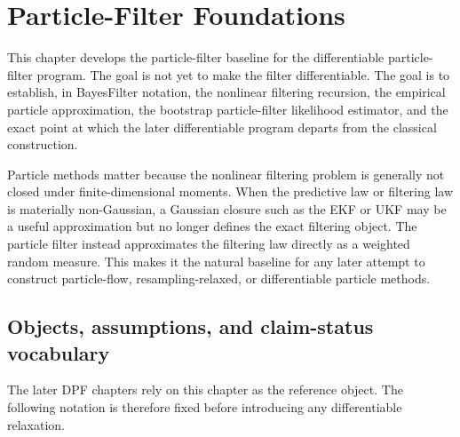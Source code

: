 \chapter{Particle-Filter Foundations}
\label{ch:bf-particle-filters}

This chapter develops the particle-filter baseline for the differentiable
particle-filter program.  The goal is not yet to make the filter
differentiable.  The goal is to establish, in BayesFilter notation, the
nonlinear filtering recursion, the empirical particle approximation, the
bootstrap particle-filter likelihood estimator, and the exact point at which the
later differentiable program departs from the classical construction.

Particle methods matter because the nonlinear filtering problem is generally not
closed under finite-dimensional moments.  When the predictive law or filtering
law is materially non-Gaussian, a Gaussian closure such as the EKF or UKF may be
a useful approximation but no longer defines the exact filtering object.  The
particle filter instead approximates the filtering law directly as a weighted
random measure.  This makes it the natural baseline for any later attempt to
construct particle-flow, resampling-relaxed, or differentiable particle
methods.

\section{Objects, assumptions, and claim-status vocabulary}
\label{sec:bf-pf-objects}

The later DPF chapters rely on this chapter as the reference object.  The
following notation is therefore fixed before introducing any differentiable
relaxation.

